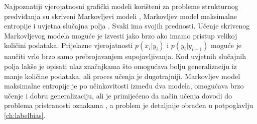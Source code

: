 Najpoznatiji vjerojatnosni grafički modeli korišteni za probleme strukturnog
predviđanja su skriveni Markovljevi modeli ,
Markovljev model maksimalne entropije  i
uvjetna slučajna polja . Svaki ima svojih
prednosti. Učenje skrivenog Markovljevog modela moguće je izvesti jako brzo ako
imamo pristup velikoj količini podataka. Prijelazne vjerojatnosti $p(x_i | y_i)$
i $p(y_i | y_{i-1})$ moguće je naučiti vrlo brzo samo prebrojavanjem
supojavljivanja. Kod uvjetnih slučajnih polja lakše je opisati ulaz značajkama
što omogućava bolju generalizaciju iz manje količine podataka, ali proces učenja
je dugotrajniji. Markovljev model maksimalne entropije je po učinkovitosti
između dva modela, omogućava brzo učenje i dobru generalizaciju, ali je
primijećeno da način učenja dovodi do problema pristranosti oznakama  \citep{lafferty2001conditional}, a problem je detaljnije obrađen u
potpoglavlju \ref{ch:labelbias}.

